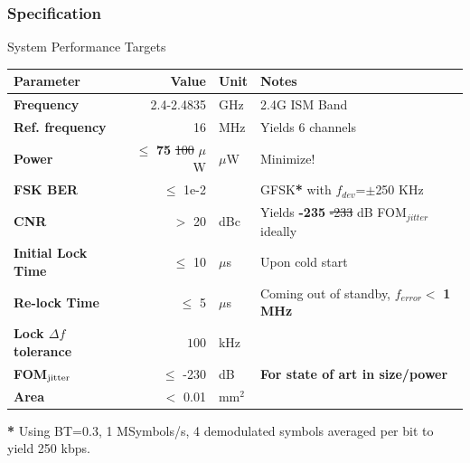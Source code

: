 \documentclass[t, screen, aspectratio=43]{beamer}
\begin{document}

\begin{frame}
	\frametitle{Specification\color{black}}
	\begin{block}{System Performance Targets}
		\tiny
		\begin{table}[h!]
			\centering
			\def\arraystretch{1.5}		
			\setlength\arrayrulewidth{0.75pt}
			\setlength{\tabcolsep}{1em} %
			\begin{tabular}{|l|r|l|l|}
				\hline 
				\rule[-1ex]{0pt}{2.5ex} \cellcolor{gray!40}\textbf{Parameter} & \cellcolor{gray!40}\textbf{Value} & \cellcolor{gray!40}\textbf{Unit }& \cellcolor{gray!40}\textbf{Notes}\\ 
				\hline 
				\rule[-1ex]{0pt}{2.5ex} \textbf{Frequency}  & 2.4-2.4835 & GHz & 2.4G ISM Band\\ 
				\hline 
				\rule[-1ex]{0pt}{2.5ex} \textbf{Ref. frequency} & 16 & MHz & Yields 6 channels \\ 
				\hline 
				\rule[-1ex]{0pt}{2.5ex} \textbf{Power} & $\leq$ \textbf{75} {\color{red}\st{100}} $\mu$W  &$\mu$W & Minimize!\\ 
				\hline 
				\rule[-1ex]{0pt}{2.5ex} \textbf{FSK BER} & $\leq$ 1e-2  & & GFSK\textbf{*} with $f_{dev}$=$\pm$250 KHz\\ 
				\hline 
				\rule[-1ex]{0pt}{2.5ex} \textbf{CNR} & $>$ 20 & dBc&Yields  \textbf{-235} {\color{red}\st{-233}} dB FOM$_{jitter}$ ideally \\ 
				\hline 
				\rule[-1ex]{0pt}{2.5ex} \textbf{Initial Lock Time} & $\leq$ 10 & $\mu$s & Upon cold start \\ 
				\hline 
				\rule[-1ex]{0pt}{2.5ex} \textbf{Re-lock Time} & $\leq$ 5 & $\mu$s & Coming out of standby, $f_{error} <$ \textbf{1 MHz} \\ 
				\hline 
				\rule[-1ex]{0pt}{2.5ex} \textbf{Lock $\Delta f$ tolerance} & $100$ & kHz& \\ 
				\hline 
				\rule[-1ex]{0pt}{2.5ex} \textbf{FOM}$_{\textnormal{jitter}}$ & $\leq$ -230 & dB & \textbf{For state of art in size/power} \\ 
				\hline 
				\rule[-1ex]{0pt}{2.5ex} \textbf{Area} & $<$ 0.01  & mm$^2$ & \\ 
				\hline 
			\end{tabular} 
		\end{table}   
		\textbf{*} Using BT=0.3, 1 MSymbols/s, 4 demodulated symbols averaged per bit to yield 250 kbps.
	\end{block}    
\end{frame}
\end{document}
